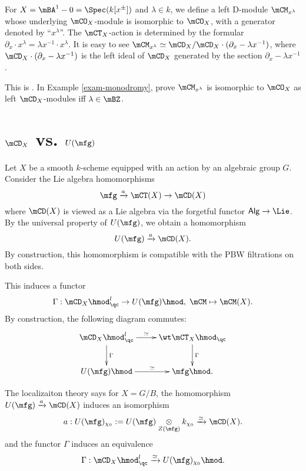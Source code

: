 	\begin{exam}
		\label{exam-monodromy}
		For $X=\mBA^1-0=\Spec (k[x^\pm])$ and $\lambda\in k$, we define a left D-module $\mCM_{x^\lambda}$ whose underlying $\mCO_X$-module is isomorphic to $\mCO_X$, with a generator denoted by ``$x^\lambda$''. The $\mCT_X$-action is determined by the formular $\partial_x \cdot x^\lambda = \lambda x^{-1}\cdot x^{\lambda}$. It is easy to see $\mCM_{x^\lambda} \simeq \mCD_X/\mCD_X\cdot(\partial_x-\lambda x^{-1})$, where $\mCD_X\cdot(\partial_x-\lambda x^{-1})$ is the left ideal of $\mCD_X$ generated by the section $\partial_x-\lambda x^{-1}$.
	\end{exam}

	\begin{exe}
		This is . In Example \ref{exam-monodromy}, prove $\mCM_{x^\lambda}$ is isomorphic to $\mCO_X$ as left $\mCD_X$-modules iff $\lambda\in \mBZ$.
	\end{exe}
	

\section{\texorpdfstring{$\mCD_X$}{DX} vs. \texorpdfstring{$U(\mfg)$}{U(g)}}
	
	\begin{constr}
		Let $X$ be a smooth $k$-scheme equipped with an action by an algebraic group $G$. Consider the Lie algebra homomorphisms
		\[
			\mfg \xrightarrow{a} \mCT(X) \to \mCD(X)
		\]
		where $\mCD(X)$ is viewed as a Lie algebra via the forgetful functor $\mathsf{Alg} \to \Lie$. By the universal property of $U(\mfg)$, we obtain a homomorphism
		\[
			U(\mfg) \xrightarrow{a}  \mCD(X).
		\]
		By construction, this homomorphism is compatible with the PBW filtrations on both sides.

		This induces a functor
		\[
			\Gamma: \mCD_X\hmod^l_\qc \to U(\mfg)\hmod, \; \mCM \mapsto \mCM(X).
		\]
		By construction, the following diagram commutes:
		\[
			\xymatrix{
				\mCD_X\hmod^l_\qc \ar[r]^-\simeq \ar[d]^-\Gamma&
				\wt\mCT_X\hmod_\qc \ar[d]^-\Gamma \\
				U(\mfg)\hmod \ar[r]^-\simeq & \mfg\hmod.
			}
		\]
	\end{constr}

	\begin{rem}
		The localizaiton theory says for $X=G/B$, the homomorphism $U(\mfg) \xrightarrow{a}  \mCD(X)$ induces an isomorphism
		\[
			a: U(\mfg)_{\chi_0}:= U(\mfg)\ot_{Z(\mfg)} k_{\chi_0} \xrightarrow{\simeq}\mCD(X).
		\]
		and the functor $\Gamma$ induces an equivalence
		\[
			\Gamma: \mCD_X\hmod^l_\qc \xrightarrow{\simeq} U(\mfg)_{\chi_0}\hmod.
		\]
	\end{rem}

